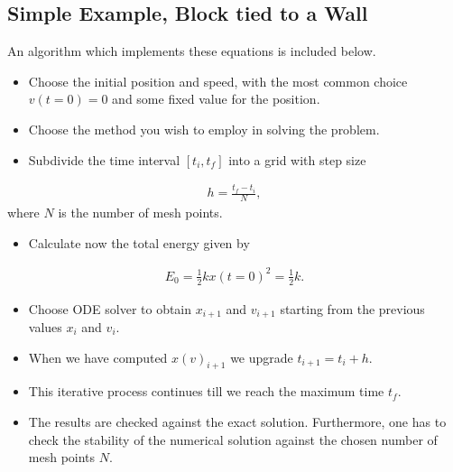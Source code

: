 \documentclass[letterpaper,10pt,english]{sphinxmanual}
\begin{document}
\subsection{Simple Example, Block tied to a Wall}
\label{\detokenize{chapter2:id3}}
An algorithm which implements these equations is included below.
\begin{itemize}
\item {} 
Choose the initial position and speed, with the most common choice \(v(t=0)=0\) and some fixed value for the position.

\item {} 
Choose the method you wish to employ in solving the problem.

\item {} 
Subdivide the time interval \([t_i,t_f] \) into a grid with step size

\end{itemize}
\begin{equation*}
\begin{split}
h=\frac{t_f-t_i}{N},
\end{split}
\end{equation*}
where \(N\) is the number of mesh points.
\begin{itemize}
\item {} 
Calculate now the total energy given by

\end{itemize}
\begin{equation*}
\begin{split}
E_0=\frac{1}{2}kx(t=0)^2=\frac{1}{2}k.
\end{split}
\end{equation*}\begin{itemize}
\item {} 
Choose ODE solver to obtain \(x_{i+1}\) and \(v_{i+1}\) starting from the previous values \(x_i\) and \(v_i\).

\item {} 
When we have computed \(x(v)_{i+1}\) we upgrade  \(t_{i+1}=t_i+h\).

\item {} 
This iterative  process continues till we reach the maximum time \(t_f\).

\item {} 
The results are checked against the exact solution. Furthermore, one has to check the stability of the numerical solution against the chosen number of mesh points \(N\).

\end{itemize}
\end{document}
